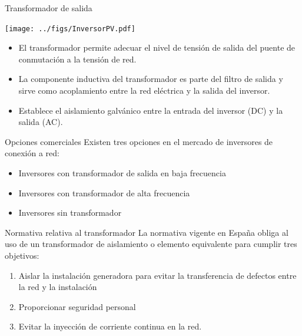 \documentclass[aspectratio=169, usenames,svgnames,dvipsnames]{beamer}
\begin{document}
\begin{frame}[label={sec:org59fb43c}]{Transformador de salida}
\begin{center}
\texttt{[image: ../figs/InversorPV.pdf]}
\end{center}

\begin{itemize}
\item El transformador permite adecuar el nivel de tensión de salida del
puente de conmutación a la tensión de red.

\item La componente inductiva del transformador es parte del filtro de
salida y sirve como acoplamiento entre la red eléctrica y la salida
del inversor.

\item Establece el aislamiento galvánico entre la entrada del inversor (DC)
y la salida (AC).
\end{itemize}
\end{frame}
\begin{frame}[label={sec:org4f4ca48}]{Opciones comerciales}
Existen tres opciones en el mercado de inversores de conexión a red:

\begin{itemize}
\item Inversores con transformador de salida en baja frecuencia

\item Inversores con transformador de alta frecuencia

\item Inversores sin transformador
\end{itemize}
\end{frame}
\begin{frame}[label={sec:orgd170476}]{Normativa relativa al transformador}
La normativa vigente en España obliga al uso de un transformador de aislamiento o elemento equivalente para cumplir tres objetivos:

\begin{enumerate}
\item Aislar la instalación generadora para evitar la transferencia de defectos entre la red y la instalación

\item Proporcionar seguridad personal

\item Evitar la inyección de corriente continua en la red.
\end{enumerate}
\end{frame}
\end{document}
